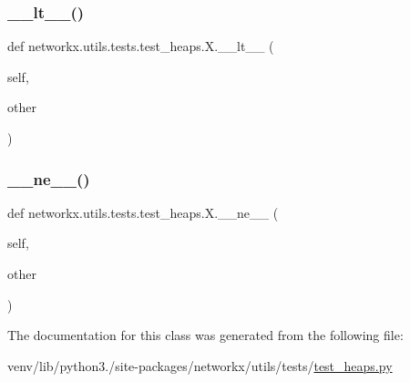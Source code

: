 \subsubsection{\texorpdfstring{\+\_\+\+\_\+lt\+\_\+\+\_\+()}{\_\_lt\_\_()}}
{\footnotesize\ttfamily def networkx.\+utils.\+tests.\+test\+\_\+heaps.\+X.\+\_\+\+\_\+lt\+\_\+\+\_\+ (\begin{DoxyParamCaption}\item[{}]{self,  }\item[{}]{other }\end{DoxyParamCaption})}

\mbox{\label{classnetworkx_1_1utils_1_1tests_1_1test__heaps_1_1X_a2f64aaf1f365f5ab117d27d555fec684}} 
\subsubsection{\texorpdfstring{\+\_\+\+\_\+ne\+\_\+\+\_\+()}{\_\_ne\_\_()}}
{\footnotesize\ttfamily def networkx.\+utils.\+tests.\+test\+\_\+heaps.\+X.\+\_\+\+\_\+ne\+\_\+\+\_\+ (\begin{DoxyParamCaption}\item[{}]{self,  }\item[{}]{other }\end{DoxyParamCaption})}



The documentation for this class was generated from the following file\+:\begin{DoxyCompactItemize}
\item 
venv/lib/python3./site-\/packages/networkx/utils/tests/\hyperlink{test__heaps_8py}{test\+\_\+heaps.\+py}\end{DoxyCompactItemize}
